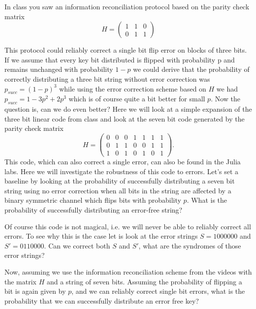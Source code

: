 \documentclass[a4paper,10pt,landscape,twocolumn]{scrartcl}
\begin{document}
\begin{exercise}
\begin{subex}[Problem 3.1]
In class you saw an information reconciliation protocol based on the parity check matrix
\begin{equation}
H = \begin{pmatrix} 1 & 1 & 0\\ 0 & 1 & 1 \end{pmatrix}
\end{equation}

This protocol could reliably correct a single bit flip error on blocks of three bits. If we assume that every key bit distributed is flipped with probability p and remains unchanged with probability $1-p$ we could derive that the probability of correctly distributing a three bit string without error correction was $p_{succ} = (1-p)^3$
while using the error correction scheme based on $H$ we had $p_{succ} = 1-3p^2 + 2p^3$
which is of course quite a bit better for small $p$. Now the question is, can we do even better? Here we will look at a simple expansion of the three bit linear code from class and look at the seven bit code generated by the parity check matrix
\begin{equation}
H = \begin{pmatrix} 0& 0& 0& 1& 1& 1& 1 \\ 0& 1& 1& 0& 0& 1& 1\\ 1& 0& 1& 0& 1& 0& 1 \end{pmatrix}.
\end{equation}
This code, which can also correct a single error, can also be found in the Julia labs. Here we will investigate the robustness of this code to errors. Let's set a baseline by looking at the probability of successfully distributing a seven bit string using no error correction when all bits in the string are affected by a binary symmetric channel which flips bits with probability $p$. What is the probability of successfully distributing an error-free string?
\end{subex}

\begin{subex}[Problem 3.2]
Of course this code is not magical, i.e. we will never be able to reliably correct all errors. To see why this is the case let is look at the error strings $S = 1000000$ and $S' = 0110000$. Can we correct both $S$ and $S'$, what are the syndromes of those error strings?
\end{subex}
\begin{subex}[Problem 3.3]
Now, assuming we use the information reconciliation scheme from the videos with the matrix $H$ and a string of seven bits. Assuming the probability of flipping a bit is again given by $p$, and we can reliably correct single bit errors, what is the probability that we can successfully distribute an error free key?
\end{subex}
\end{exercise}
\end{document}
